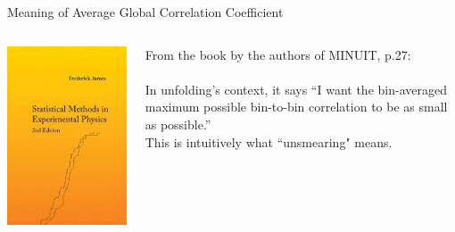 \documentclass[aspectratio=169]{beamer}
\begin{document}
\begin{frame}{Meaning of Average Global Correlation Coefficient}
  \begin{columns}
    \begin{column}{.4\textwidth}
      \centering
      \includegraphics[height=\textheight]{figures/james_book.jpg}
    \end{column}
    \begin{column}{.6\textwidth}
      \small
      From the book by the authors of MINUIT, p.27:\\
      \noindent{}\\
      \vspace{\baselineskip}
      In unfolding's context, it says ``I want the bin-averaged maximum possible bin-to-bin correlation to be as small as possible.''\\
      This is intuitively what ``unsmearing" means.
    \end{column}
  \end{columns}
\end{frame}
\end{document}
